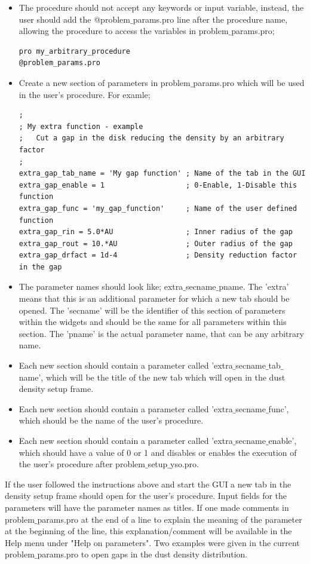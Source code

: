 \documentclass{report}
\begin{document}
\begin{itemize}
\item The procedure should not accept any keywords or input variable,
  instead, the user should add the @problem$\_$params.pro line after the
  procedure name, allowing the procedure to access the variables in
  problem$\_$params.pro;
\begin{verbatim}
pro my_arbitrary_procedure
@problem_params.pro
\end{verbatim}
\item Create a new section of parameters in problem$\_$params.pro which will
  be used in the user's procedure.  For examle;
\begin{verbatim}
;
; My extra function - example 
;   Cut a gap in the disk reducing the density by an arbitrary factor
;
extra_gap_tab_name = 'My gap function' ; Name of the tab in the GUI
extra_gap_enable = 1                   ; 0-Enable, 1-Disable this function
extra_gap_func = 'my_gap_function'     ; Name of the user defined function 
extra_gap_rin = 5.0*AU                 ; Inner radius of the gap
extra_gap_rout = 10.*AU                ; Outer radius of the gap
extra_gap_drfact = 1d-4                ; Density reduction factor in the gap

\end{verbatim}
\item The parameter names should look like; extra$\_$secname$\_$pname. The
  'extra' means that this is an additional parameter for which a new tab
  should be opened. The 'secname' will be the identifier of this section of
  parameters within the widgets and should be the same for all parameters
  within this section. The 'pname' is the actual parameter name, that can be
  any arbitrary name.
\item Each new section should contain a parameter called
  'extra$\_$secname$\_$tab$\_$name', which will be the title of the new tab
  which will open in the dust density setup frame.
\item Each new section should contain a parameter called
  'extra$\_$secname$\_$func', which should be the name of the user's
  procedure.
\item Each new section should contain a parameter called
  'extra$\_$secname$\_$enable', which should have a value of 0 or 1 and
  disables or enables the execution of the user's procedure after
  problem$\_$setup$\_$yso.pro.
\end{itemize}

If the user followed the instructions above and start the GUI a new tab in
the density setup frame should open for the user's procedure. Input fields
for the parameters will have the parameter names as titles. If one made
comments in problem$\_$params.pro at the end of a line to explain the
meaning of the parameter at the beginning of the line, this
explanation/comment will be available in the Help menu under "Help on
parameters".  Two examples were given in the current problem$\_$params.pro
to open gaps in the dust density distribution.
 
\end{document}
